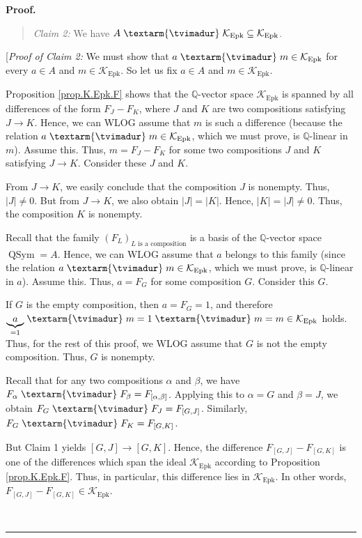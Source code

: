 \documentclass[numbers=enddot,12pt,final,onecolumn,notitlepage]{scrartcl}%
\theoremstyle{definition}
\newenvironment{statement}{\begin{quote}}{\end{quote}}
\newenvironment{proof}[1][Proof]{\noindent\textbf{#1.} }{\ \rule{0.5em}{0.5em}}
\newenvironment{verlong}{}{}
\newcommand{\tvi}{\left. \textarm{\tvimadur} \right.}
\begin{document}
\begin{verlong}
\begin{proof}
\begin{statement}
\textit{Claim 2:} We have $A\tvi  \mathcal{K}_{\operatorname*{Epk}}%
\subseteq\mathcal{K}_{\operatorname*{Epk}}$.
\end{statement}

[\textit{Proof of Claim 2:} We must show that $a\tvi  m\in\mathcal{K}%
_{\operatorname*{Epk}}$ for every $a\in A$ and $m\in\mathcal{K}%
_{\operatorname*{Epk}}$. So let us fix $a\in A$ and $m\in\mathcal{K}%
_{\operatorname*{Epk}}$.

Proposition \ref{prop.K.Epk.F} shows that the $\mathbb{Q}$-vector space
$\mathcal{K}_{\operatorname*{Epk}}$ is spanned by all differences of the form
$F_{J}-F_{K}$, where $J$ and $K$ are two compositions satisfying $J\rightarrow
K$. Hence, we can WLOG assume that $m$ is such a difference (because the
relation $a\tvi  m\in\mathcal{K}_{\operatorname*{Epk}}$, which we must prove,
is $\mathbb{Q}$-linear in $m$). Assume this. Thus, $m=F_{J}-F_{K}$ for some
two compositions $J$ and $K$ satisfying $J\rightarrow K$. Consider these $J$
and $K$.

From $J\rightarrow K$, we easily conclude that the composition $J$ is
nonempty. Thus, $\left\vert J\right\vert \neq0$. But from $J\rightarrow K$, we
also obtain $\left\vert J\right\vert =\left\vert K\right\vert $. Hence,
$\left\vert K\right\vert =\left\vert J\right\vert \neq0$. Thus, the
composition $K$ is nonempty.

Recall that the family $\left(  F_{L}\right)  _{L\text{ is a composition}}$ is
a basis of the $\mathbb{Q}$-vector space $\operatorname*{QSym}=A$. Hence, we
can WLOG assume that $a$ belongs to this family (since the relation
$a\tvi  m\in\mathcal{K}_{\operatorname*{Epk}}$, which we must prove, is
$\mathbb{Q}$-linear in $a$). Assume this. Thus, $a=F_{G}$ for some composition
$G$. Consider this $G$.

If $G$ is the empty composition, then $a=F_{G}=1$, and therefore
$\underbrace{a}_{=1}\tvi  m=1\tvi  m=m\in\mathcal{K}_{\operatorname*{Epk}}$
holds. Thus, for the rest of this proof, we WLOG assume that $G$ is not the
empty composition. Thus, $G$ is nonempty.

Recall that for any two compositions $\alpha$ and $\beta$, we have $F_{\alpha
}\tvi  F_{\beta}=F_{\left[  \alpha,\beta\right]  }$. Applying this to
$\alpha=G$ and $\beta=J$, we obtain $F_{G}\tvi  F_{J}=F_{\left[  G,J\right]
}$. Similarly, $F_{G}\tvi  F_{K}=F_{\left[  G,K\right]  }$.

But Claim 1 yields $\left[  G,J\right]  \rightarrow\left[  G,K\right]  $.
Hence, the difference $F_{\left[  G,J\right]  }-F_{\left[  G,K\right]  }$ is
one of the differences which span the ideal $\mathcal{K}_{\operatorname*{Epk}%
}$ according to Proposition \ref{prop.K.Epk.F}. Thus, in particular, this
difference lies in $\mathcal{K}_{\operatorname*{Epk}}$. In other words,
$F_{\left[  G,J\right]  }-F_{\left[  G,K\right]  }\in\mathcal{K}%
_{\operatorname*{Epk}}$.


\end{proof}
\end{verlong}
\end{document}
